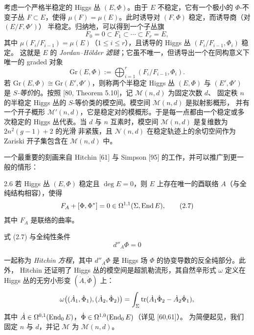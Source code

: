 考虑一个严格半稳定的 Higgs 丛 $(E,\Phi)$。由于 $E$ 不稳定，它有一个极小的 $\Phi$-不变子丛
$F\subset E$，使得 $\mu(F)=\mu(E)$。此时诱导对 $(F,\Phi)$ 稳定，而诱导商（对 $(E/F,\Phi')$）
半稳定。归纳地，可以得到一个子丛旗
\[
  F_0=0\subset F_1\subset\cdots\subset F_r=E,
\]
其中 $\mu(F_i/F_{i-1})=\mu(E)$（$1\le i\le r$），且诱导的 Higgs 丛 $(F_i/F_{i-1},\Phi_i)$ 稳定。
这就是 $E$ 的 \emph{Jordan--Hölder 滤链}；它虽不唯一，但诱导出一个在同构意义下唯一的 graded 对象
\[
  \mathrm{Gr}(E,\Phi) := \bigoplus_{i=1}^{r}(F_i/F_{i-1},\Phi_i).
\]
若 $\mathrm{Gr}(E,\Phi)\cong\mathrm{Gr}(E',\Phi')$，则称两个半稳定 Higgs 丛 $(E,\Phi)$ 与
$(E',\Phi')$ 是 \emph{$S$-等价}的。按照 [80, Theorem 5.10]，记 $\mathcal{M}(n,d)$ 为固定次数 $d$、
固定秩 $n$ 的半稳定 Higgs 丛的 $S$-等价类的模空间。模空间 $\mathcal{M}(n,d)$ 是拟射影概形，
并有一个开子概形 $\mathcal{M}'(n,d)$，它是稳定对的模概形。于是每一点都由一个稳定或多次稳定的
Higgs 丛代表。当 $d$ 与 $n$ 互素时，模空间 $\mathcal{M}(n,d)$ 是复维数为 $2n^2(g-1)+2$ 的光滑
非紧簇，且 $\mathcal{N}(n,d)$ 在稳定轨迹上的余切空间作为 Zariski 开子集包含在 $\mathcal{M}(n,d)$ 中。

一个最重要的刻画来自 Hitchin [61] 与 Simpson [95] 的工作，并可以推广到更一般的情形：

\begin{thm}{2.6}
若 Higgs 丛 $(E,\Phi)$ 稳定且 $\deg E=0$，则 $E$ 上存在唯一的酉联络 $A$（与全纯结构相容），使得
\begin{equation}
  F_A + [\Phi,\Phi^*] = 0 \in \Omega^{1,1}(\Sigma,\operatorname{End} E), \tag{2.7}
\end{equation}
其中 $F_A$ 是联络的曲率。
\end{thm}

式 (2.7) 与全纯性条件
\begin{equation}
  d''_A\Phi = 0 \tag{2.8}
\end{equation}

一起称为 \emph{Hitchin 方程}，其中 $d''_A\Phi$ 是 Higgs 场 $\Phi$ 的协变导数的反全纯部分。此外，
Hitchin 还证明了 Higgs 丛的模空间是超凯勒流形，其自然辛形式 $\omega$ 定义在 Higgs 丛的无穷小形变
$(\dot A,\dot\Phi)$ 上：
\[
  \omega\big((\dot A_1,\dot\Phi_1),(\dot A_2,\dot\Phi_2)\big)
  = \int_\Sigma \operatorname{tr}(\dot A_1\dot\Phi_2-\dot A_2\dot\Phi_1),
\]
其中 $\dot A\in\Omega^{0,1}(\operatorname{End}_0 E)$，$\dot\Phi\in\Omega^{1,0}(\operatorname{End}_0 E)$（详见 [60,61]）。
为简便起见，我们固定 $n$ 与 $d$，并记 $\mathcal{M}$ 为 $\mathcal{M}(n,d)$。

